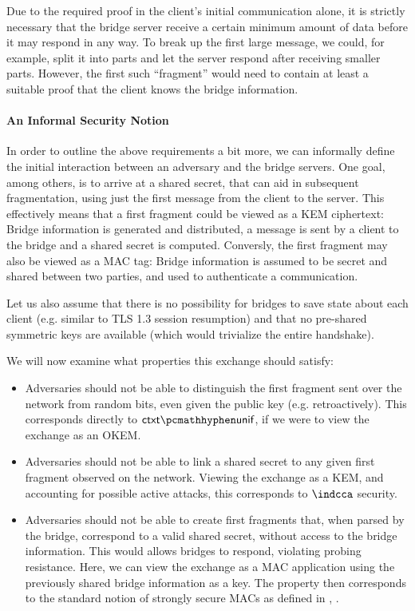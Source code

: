 Due to the required proof in the client's initial communication alone, it is strictly necessary that the bridge server receive a certain minimum amount of data before it may respond in any way.
To break up the first large \drivel{} message, we could, for example, split it into parts and let the server respond after receiving smaller parts. However, the first such ``fragment'' would need to contain at least a suitable proof that the client knows the bridge information.

\paragraph{An Informal Security Notion}
In order to outline the above requirements a bit more, we can informally define the initial interaction between an adversary and the bridge servers. One goal, among others, is to arrive at a shared secret, that can aid in subsequent fragmentation, using just the first message from the client to the server.
This effectively means that a first fragment could be viewed as a KEM ciphertext: Bridge information is generated and distributed, a message is sent by a client to the bridge and a shared secret is computed. Conversly, the first fragment may also be viewed as a MAC tag: Bridge information is assumed to be secret and shared between two parties, and used to authenticate a communication.

Let us also assume that there is no possibility for bridges to save state about each client (e.g. similar to TLS 1.3 session resumption) and that no pre-shared symmetric keys are available (which would trivialize the entire handshake).

We will now examine what properties this exchange should satisfy:
\begin{itemize}
    \item Adversaries should not be able to distinguish the first fragment sent over the network from random bits, even given the public key (e.g. retroactively). This corresponds directly to $\ctxtunif$, if we were to view the exchange as an OKEM.

    \item Adversaries should not be able to link a shared secret to any given first fragment observed on the network. Viewing the exchange as a KEM, and accounting for possible active attacks, this corresponds to $\indcca$ security.
    
    \item Adversaries should not be able to create first fragments that, when parsed by the bridge, correspond to a valid shared secret, without access to the bridge information. This would allows bridges to respond, violating probing resistance. Here, we can view the exchange as a MAC application using the previously shared bridge information as a key. The property then corresponds to the standard notion of strongly secure MACs as defined in \cite[Definition~4.3]{katz_lindell}, \cite[Chapter~2]{AC:BelNam00}.
\end{itemize}

